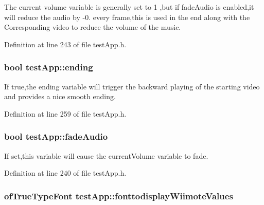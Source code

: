 The current volume variable is generally set to 1 ,but if fade\-Audio is enabled,it will reduce the audio by -\/0. every frame,this is used in the end along with the Corresponding video to reduce the volume of the music. 



Definition at line 243 of file test\-App.\-h.

\hypertarget{classtest_app_acf09303bc452d2a38098f6bf94655408}{
\subsubsection[{ending}]{\setlength{\rightskip}{0pt plus 5cm}bool test\-App\-::ending}}\label{classtest_app_acf09303bc452d2a38098f6bf94655408}


If true,the ending variable will trigger the backward playing of the starting video and provides a nice smooth ending. 



Definition at line 259 of file test\-App.\-h.

\hypertarget{classtest_app_a918c09b5a4389a8402cfacb25d390226}{
\subsubsection[{fade\-Audio}]{\setlength{\rightskip}{0pt plus 5cm}bool test\-App\-::fade\-Audio}}\label{classtest_app_a918c09b5a4389a8402cfacb25d390226}


If set,this variable will cause the current\-Volume variable to fade. 



Definition at line 240 of file test\-App.\-h.

\hypertarget{classtest_app_ab336e228840f001d15f9b1eb3a30972f}{
\subsubsection[{fonttodisplay\-Wiimote\-Values}]{\setlength{\rightskip}{0pt plus 5cm}of\-True\-Type\-Font test\-App\-::fonttodisplay\-Wiimote\-Values}}\label{classtest_app_ab336e228840f001d15f9b1eb3a30972f}


